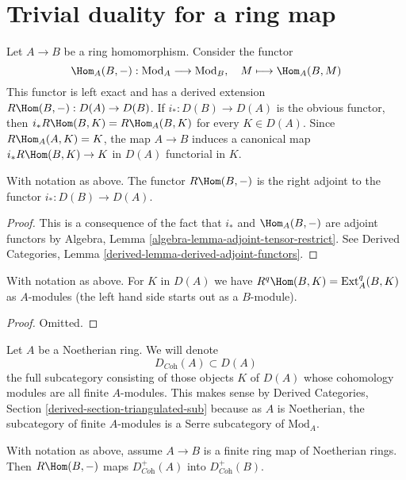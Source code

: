\section{Trivial duality for a ring map}
\label{section-trivial}

\noindent
Let $A \to B$ be a ring homomorphism. Consider the functor
$$
\Hom_A(B, -) : \text{Mod}_A \longrightarrow \text{Mod}_B,\quad
M \longmapsto \Hom_A(B, M)
$$
This functor is left exact and has a derived extension
$R\Hom(B, -) : D(A) \to D(B)$. If $i_* : D(B) \to D(A)$ is the obvious
functor, then $i_*R\Hom(B, K) = R\Hom_A(B, K)$ for every $K \in D(A)$.
Since $R\Hom_A(A, K) = K$, the map $A \to B$ induces a canonical map
$i_*R\Hom(B, K) \to K$ in $D(A)$ functorial in $K$.

\begin{lemma}
\label{lemma-right-adjoint}
With notation as above. The functor $R\Hom(B, -)$ is the
right adjoint to the functor $i_* : D(B) \to D(A)$.
\end{lemma}

\begin{proof}
This is a consequence of the fact that $i_*$ and $\Hom_A(B, -)$ are
adjoint functors by Algebra, Lemma \ref{algebra-lemma-adjoint-tensor-restrict}.
See Derived Categories, Lemma \ref{derived-lemma-derived-adjoint-functors}.
\end{proof}

\begin{lemma}
\label{lemma-RHom-ext}
With notation as above. For $K$ in $D(A)$ we have
$R^q\Hom(B, K) = \text{Ext}_A^q(B, K)$
as $A$-modules (the left hand side starts out as a $B$-module).
\end{lemma}

\begin{proof}
Omitted.
\end{proof}

\noindent
Let $A$ be a Noetherian ring. We will denote
$$
D_{\textit{Coh}}(A) \subset D(A)
$$
the full subcategory consisting of those objects $K$ of $D(A)$
whose cohomology modules are all finite $A$-modules. This makes sense
by Derived Categories, Section \ref{derived-section-triangulated-sub}
because as $A$ is Noetherian, the subcategory of finite $A$-modules
is a Serre subcategory of $\text{Mod}_A$.

\begin{lemma}
\label{lemma-exact-support-coherent}
With notation as above, assume $A \to B$ is a finite ring map of
Noetherian rings. Then $R\Hom(B, -)$ maps
$D^+_{\textit{Coh}}(A)$ into $D^+_{\textit{Coh}}(B)$.
\end{lemma}

